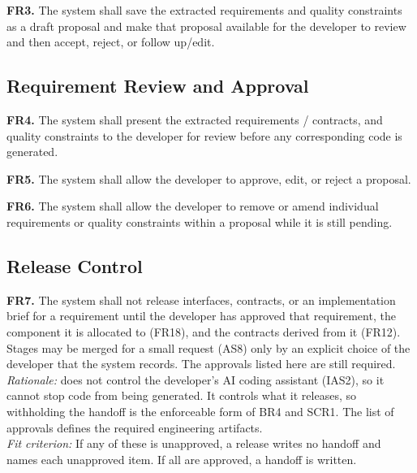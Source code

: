 \documentclass[12pt]{article}
\begin{document}
\medskip
\noindent\textbf{FR3.} The system shall save the extracted requirements and
quality constraints as a draft proposal and make that proposal available for the
developer to review and then accept, reject, or follow up/edit. 

\subsection{Requirement Review and Approval}

\medskip
\noindent\textbf{FR4.} The system shall present the extracted requirements / contracts, and quality constraints 
to the developer for review before any corresponding code is generated.

\medskip
\noindent\textbf{FR5.} The system shall allow the developer to approve, edit, or reject a proposal.

\medskip
\noindent\textbf{FR6.} The system shall allow the developer to remove or amend
individual requirements or quality constraints within a proposal while it is
still pending.

\subsection{Release Control}

\medskip
\noindent\textbf{FR7.} The system shall not release interfaces, contracts, or an
implementation brief for a requirement until the developer has approved that
requirement, the component it is allocated to (FR18), and the contracts derived
from it (FR12). Stages may be merged for a small request (AS8) only by an
explicit choice of the developer that the system records. The approvals listed
here are still required.\\
\textit{Rationale:} \progname{} does not control the developer's AI coding
assistant (IAS2), so it cannot stop code from being generated. It controls what
it releases, so withholding the handoff is the enforceable form of BR4 and SCR1.
The list of approvals defines the required engineering artifacts.\\
\textit{Fit criterion:} If any of these is unapproved, a release writes no
handoff and names each unapproved item. If all are approved, a handoff is
written.
\end{document}
